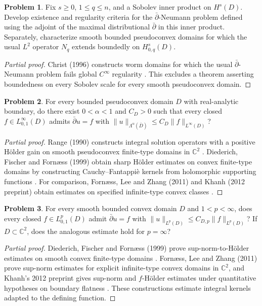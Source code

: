 \documentclass[11pt,reqno]{amsart}
\theoremstyle{definition}
\newtheorem{problem}{Problem}[section]
\theoremstyle{remark}
\begin{document}
\begin{problem}\label{b95-6-1-1}
Fix $s\geq0$, $1\leq q\leq n$, and a Sobolev inner product on $H^s(D)$. Develop existence and regularity criteria for the $\bar\partial$-Neumann problem defined using the adjoint of the maximal distributional $\bar\partial$ in this inner product. Separately, characterize smooth bounded pseudoconvex domains for which the usual $L^2$ operator $N_q$ extends boundedly on $H^s_{0,q}(D)$.
\end{problem}
\begin{proof}[Partial proof]
Christ (1996) constructs worm domains for which the usual $\bar\partial$-Neumann problem fails global $C^\infty$ regularity \cite{B95-Christ}. This excludes a theorem asserting boundedness on every Sobolev scale for every smooth pseudoconvex domain.
\end{proof}

\begin{problem}\label{b95-6-2-1}
For every bounded pseudoconvex domain $D$ with real-analytic boundary, do there exist $0<\alpha<1$ and $C_D>0$ such that every closed $f\in L^\infty_{0,1}(D)$ admits $\bar\partial u=f$ with
$\|u\|_{\Lambda^\alpha(\overline D)}\leq C_D\|f\|_{L^\infty(D)}$?
\end{problem}
\begin{proof}[Partial proof]
Range (1990) constructs integral solution operators with a positive H\"older gain on smooth pseudoconvex finite-type domains in $\mathbb C^2$ \cite{AN-Range90}. Diederich, Fischer and Forn\ae ss (1999) obtain sharp H\"older estimates on convex finite-type domains by constructing Cauchy--Fantappi\`e kernels from holomorphic supporting functions \cite{AN-DFF99}. For comparison, Forn\ae ss, Lee and Zhang (2011) and Khanh (2012 preprint) obtain estimates on specified infinite-type convex classes \cite{B95-FLZ,B95-Khanh}.
\end{proof}

\begin{problem}\label{b95-6-3-2}
For every smooth bounded convex domain $D$ and $1<p<\infty$, does every closed $f\in L^p_{0,1}(D)$ admit $\bar\partial u=f$ with $\|u\|_{L^p(D)}\leq C_{D,p}\|f\|_{L^p(D)}$? If $D\subset\mathbb C^2$, does the analogous estimate hold for $p=\infty$?
\end{problem}
\begin{proof}[Partial proof]
Diederich, Fischer and Forn\ae ss (1999) prove sup-norm-to-H\"older estimates on smooth convex finite-type domains \cite{AN-DFF99}. Forn\ae ss, Lee and Zhang (2011) prove sup-norm estimates for explicit infinite-type convex domains in $\mathbb C^2$, and Khanh's 2012 preprint gives sup-norm and $f$-H\"older estimates under quantitative hypotheses on boundary flatness \cite{B95-FLZ,B95-Khanh}. These constructions estimate integral kernels adapted to the defining function.
\end{proof}
\end{document}
